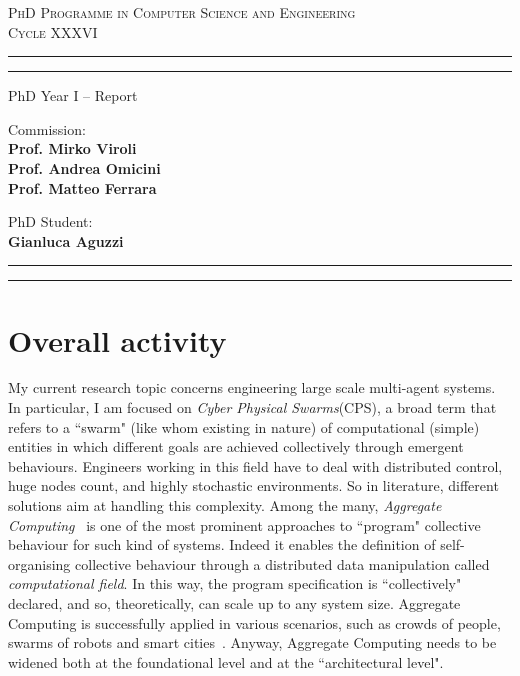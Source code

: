 \documentclass[12pt]{article}
\begin{document}
\begin{center}
	{{
		\Large{
			\textsc{PhD Programme in Computer Science and Engineering \\ Cycle XXXVI}
			}
	}} 
	\rule[0.1cm]{\textwidth}{0.1mm}
	\rule[0.4cm]{\textwidth}{0.6mm}
\end{center}

\begin{center}
	\vspace{8mm}
	{\LARGE{PhD Year I -- Report}}
\end{center}
\vspace{8mm}
\par
\noindent
\begin{minipage}[t]{0.47\textwidth}

{\large{Commission: \\\bf
Prof. Mirko Viroli \\
Prof. Andrea Omicini \\
Prof. Matteo Ferrara} 
}
\end{minipage}
\hfill
\begin{minipage}[t]{0.47\textwidth}
	\raggedleft
	{
		\large{PhD Student: \\\bf Gianluca Aguzzi }
	}
\end{minipage}
\vspace{10mm}

{
	\raggedright
	\rule[0.1cm]{\textwidth}{0.6mm}
	\rule[0.5cm]{\textwidth}{0.1mm}
}

\section{Overall activity}
My current research topic concerns engineering large scale multi-agent systems. In particular, I am
 focused on \textit{Cyber Physical Swarms}(CPS), a broad term that refers to a ``swarm" (like whom
 existing in nature) of computational (simple) entities in which different goals are 
 achieved collectively through emergent behaviours. 
%
Engineers working in this field have to deal with distributed control, 
 huge nodes count, and highly stochastic environments.
%
So in literature, different solutions aim at handling this complexity.
 Among the many, \textit{Aggregate Computing}~\cite{aggregatecomputing} is one of the most
 prominent approaches to ``program" collective behaviour for such kind of systems.
%
Indeed it enables the definition of self-organising collective behaviour 
 through a distributed data manipulation called \textit{computational field}. 
 In this way, the program specification is ``collectively" declared, and so, theoretically,
 can scale up to any system size.
%
Aggregate Computing is successfully applied in various scenarios, 
 such as crowds of people, swarms of robots and smart cities~\cite{processes}.
%
Anyway, Aggregate Computing needs to be widened both 
 at the foundational level and at the ``architectural level".
\end{document}
